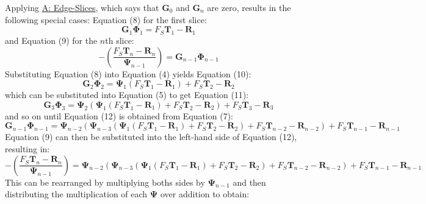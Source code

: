 \documentclass[12pt]{article}
\begin{document}
Applying \hyperref[assumpES]{A: Edge-Slices}, which says that ${\mathbf{G}}_{0}$ and ${\mathbf{G}}_{n}$ are zero, results in the following special cases: Equation (8) for the first slice:
\begin{displaymath}
{\mathbf{G}}_{1} {\mathbf{Φ}}_{1}={F_{S}} {\mathbf{T}}_{1}-{\mathbf{R}}_{1}
\end{displaymath}
and Equation (9) for the $n$th slice:
\begin{displaymath}
-\left(\frac{{F_{S}} {\mathbf{T}}_{n}-{\mathbf{R}}_{n}}{{\mathbf{Ψ}}_{n-1}}\right)={\mathbf{G}}_{n-1} {\mathbf{Φ}}_{n-1}
\end{displaymath}
Substituting Equation (8) into Equation (4) yields Equation (10):
\begin{displaymath}
{\mathbf{G}}_{2} {\mathbf{Φ}}_{2}={\mathbf{Ψ}}_{1} \left({F_{S}} {\mathbf{T}}_{1}-{\mathbf{R}}_{1}\right)+{F_{S}} {\mathbf{T}}_{2}-{\mathbf{R}}_{2}
\end{displaymath}
which can be substituted into Equation (5) to get Equation (11):
\begin{displaymath}
{\mathbf{G}}_{3} {\mathbf{Φ}}_{3}={\mathbf{Ψ}}_{2} \left({\mathbf{Ψ}}_{1} \left({F_{S}} {\mathbf{T}}_{1}-{\mathbf{R}}_{1}\right)+{F_{S}} {\mathbf{T}}_{2}-{\mathbf{R}}_{2}\right)+{F_{S}} {\mathbf{T}}_{3}-{\mathbf{R}}_{3}
\end{displaymath}
and so on until Equation (12) is obtained from Equation (7):
\begin{displaymath}
{\mathbf{G}}_{n-1} {\mathbf{Φ}}_{n-1}={\mathbf{Ψ}}_{n-2} \left({\mathbf{Ψ}}_{n-3} \left({\mathbf{Ψ}}_{1} \left({F_{S}} {\mathbf{T}}_{1}-{\mathbf{R}}_{1}\right)+{F_{S}} {\mathbf{T}}_{2}-{\mathbf{R}}_{2}\right)+{F_{S}} {\mathbf{T}}_{n-2}-{\mathbf{R}}_{n-2}\right)+{F_{S}} {\mathbf{T}}_{n-1}-{\mathbf{R}}_{n-1}
\end{displaymath}
Equation (9) can then be substituted into the left-hand side of Equation (12), resulting in:
\begin{displaymath}
-\left(\frac{{F_{S}} {\mathbf{T}}_{n}-{\mathbf{R}}_{n}}{{\mathbf{Ψ}}_{n-1}}\right)={\mathbf{Ψ}}_{n-2} \left({\mathbf{Ψ}}_{n-3} \left({\mathbf{Ψ}}_{1} \left({F_{S}} {\mathbf{T}}_{1}-{\mathbf{R}}_{1}\right)+{F_{S}} {\mathbf{T}}_{2}-{\mathbf{R}}_{2}\right)+{F_{S}} {\mathbf{T}}_{n-2}-{\mathbf{R}}_{n-2}\right)+{F_{S}} {\mathbf{T}}_{n-1}-{\mathbf{R}}_{n-1}
\end{displaymath}
This can be rearranged by multiplying boths sides by ${\mathbf{Ψ}}_{n-1}$ and then distributing the multiplication of each $\mathbf{Ψ}$ over addition to obtain:
\end{document}
